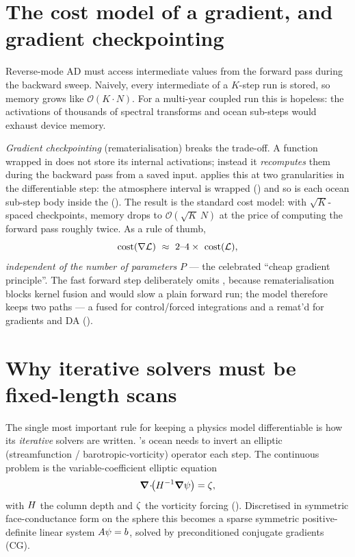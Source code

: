 \section{The cost model of a gradient, and gradient checkpointing}
\label{sec:costmodel}

Reverse-mode AD must access intermediate values from the forward pass during the backward sweep.
Naively, every intermediate of a $K$-step run is stored, so memory grows like $\mathcal{O}(K\cdot
N)$. For a multi-year coupled run this is hopeless: the activations of thousands of spectral
transforms and ocean sub-steps would exhaust device memory.

\emph{Gradient checkpointing} (rematerialisation) breaks the trade-off. A function wrapped in
 does not store its internal activations; instead it \emph{recomputes} them
during the backward pass from a saved input. \model{} applies this at two granularities in the
differentiable step: the atmosphere interval is wrapped
() and so is
each ocean sub-step body inside the 
(). The result is the
standard cost model: with $\sqrt{K}$-spaced checkpoints, memory drops to
$\mathcal{O}(\sqrt{K}\,N)$ at the price of computing the forward pass roughly twice. As a rule of
thumb,
\begin{equation}
  \text{cost}(\nabla\loss)\ \approx\ 2\text{--}4\times\ \text{cost}(\loss),
  \label{eq:cheap-gradient}
\end{equation}
\emph{independent of the number of parameters} $P$ --- the celebrated ``cheap gradient principle''.
The fast forward step deliberately omits , because rematerialisation blocks kernel
fusion and would slow a plain forward run; the model therefore keeps two paths --- a fused
 for control/forced integrations and a remat'd  for gradients and DA
().

\section{Why iterative solvers must be fixed-length scans}
\label{sec:scancg}

The single most important rule for keeping a physics model differentiable is how its
\emph{iterative} solvers are written. \model{}'s ocean needs to invert an elliptic
(streamfunction / barotropic-vorticity) operator each step. The continuous problem is the
variable-coefficient elliptic equation
\begin{equation}
  \boldsymbol{\nabla}\!\cdot\!\!\big(H^{-1}\boldsymbol{\nabla}\psi\big) = \zeta ,
  \label{eq:elliptic}
\end{equation}
with $H$ the column depth and $\zeta$ the vorticity forcing
().
Discretised in symmetric face-conductance form on the sphere this becomes a sparse symmetric
positive-definite linear system $A\psi=b$, solved by preconditioned conjugate gradients (CG).

